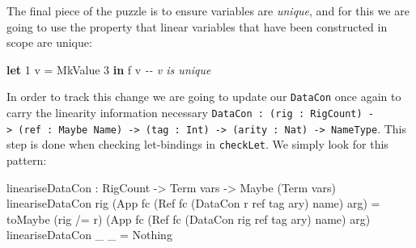 \documentclass[
]{article}
\newenvironment{Shaded}{}{}
\newcommand{\CommentTok}[1]{\textcolor[rgb]{0.38,0.63,0.69}{\textit{#1}}}
\newcommand{\DataTypeTok}[1]{\textcolor[rgb]{0.56,0.13,0.00}{#1}}
\newcommand{\DecValTok}[1]{\textcolor[rgb]{0.25,0.63,0.44}{#1}}
\newcommand{\FunctionTok}[1]{\textcolor[rgb]{0.02,0.16,0.49}{#1}}
\newcommand{\KeywordTok}[1]{\textcolor[rgb]{0.00,0.44,0.13}{\textbf{#1}}}
\newcommand{\NormalTok}[1]{#1}
\newcommand{\OperatorTok}[1]{\textcolor[rgb]{0.40,0.40,0.40}{#1}}
\newcommand{\OtherTok}[1]{\textcolor[rgb]{0.00,0.44,0.13}{#1}}
\begin{document}
\begin{Shaded}
\end{Shaded}

The final piece of the puzzle is to ensure variables are \emph{unique},
and for this we are going to use the property that linear variables that
have been constructed in scope are unique:

\begin{Shaded}
\begin{Highlighting}[]
\KeywordTok{let} \DecValTok{1}\NormalTok{ v }\OtherTok{=} \DataTypeTok{MkValue} \DecValTok{3} \KeywordTok{in}
\NormalTok{    f v }\CommentTok{{-}{-} v is unique}
\end{Highlighting}
\end{Shaded}

In order to track this change we are going to update our
\texttt{DataCon} once again to carry the linearity information necessary
\texttt{DataCon\ :\ (rig\ :\ RigCount)\ -\textgreater{}\ (ref\ :\ Maybe\ Name)\ -\textgreater{}\ (tag\ :\ Int)\ -\textgreater{}\ (arity\ :\ Nat)\ -\textgreater{}\ NameType}.
This step is done when checking let-bindings in \texttt{checkLet}. We
simply look for this pattern:

\begin{Shaded}
\begin{Highlighting}[]
\NormalTok{lineariseDataCon }\OperatorTok{:} \DataTypeTok{RigCount} \OtherTok{{-}\textgreater{}} \DataTypeTok{Term}\NormalTok{ vars }
                \OtherTok{{-}\textgreater{}} \DataTypeTok{Maybe}\NormalTok{ (}\DataTypeTok{Term}\NormalTok{ vars)}
\NormalTok{lineariseDataCon rig }
\NormalTok{  (}\DataTypeTok{App}\NormalTok{ fc (}\DataTypeTok{Ref}\NormalTok{ fc\textquotesingle{} (}\DataTypeTok{DataCon}\NormalTok{ r ref tag ary) name) arg) }\OtherTok{=}
\NormalTok{    toMaybe }
\NormalTok{      (rig }\OperatorTok{/=}\NormalTok{ r) }
\NormalTok{      (}\DataTypeTok{App}\NormalTok{ fc (}\DataTypeTok{Ref}\NormalTok{ fc\textquotesingle{} (}\DataTypeTok{DataCon}\NormalTok{ rig ref tag ary) name) arg)}
\NormalTok{lineariseDataCon \_ \_ }\OtherTok{=} \DataTypeTok{Nothing}
\end{Highlighting}
\end{Shaded}
\end{document}
